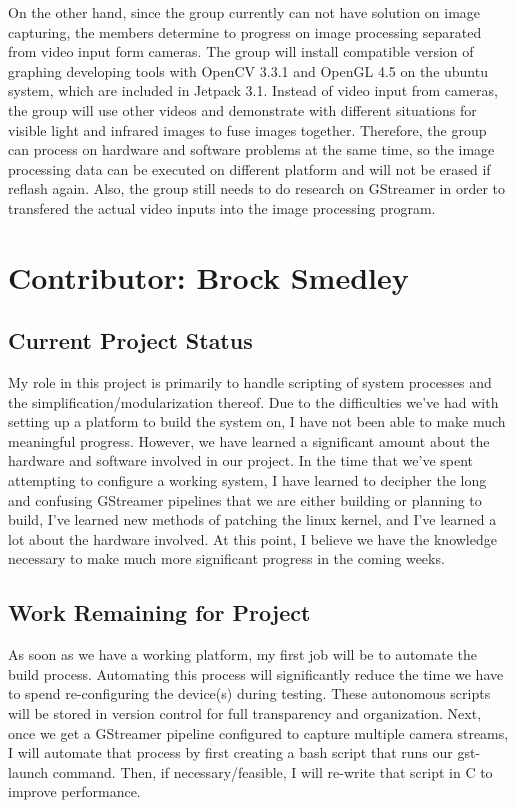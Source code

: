 \documentclass[letterpaper,10pt,serif,draftclsnofoot,onecolumn,compsoc,titlepage]{IEEEtran}
\begin{document}
 On the other hand, since the group currently can not have solution on image capturing, the members 
 determine to progress on image processing separated from video input form cameras. The group will 
 install compatible version of graphing developing tools with OpenCV 3.3.1 and OpenGL 4.5 on the ubuntu 
 system, which are included in Jetpack 3.1. Instead of video input from cameras, the group will use 
 other videos and demonstrate with different situations for visible light and infrared images to fuse 
 images together. Therefore, the group can process on hardware and software problems at the same time, 
 so the image processing data can be executed on different platform and will not be erased if reflash again. 
 Also, the group still needs to do research on GStreamer in order to transfered the actual video inputs 
 into the image processing program.\\


\newpage
\section{Contributor: Brock Smedley}
\subsection{Current Project Status}
My role in this project is primarily to handle scripting of system processes and the simplification/modularization thereof. Due to the difficulties we've had with setting up a platform to build the system on, I have not been able to make much meaningful progress. However, we have learned a significant amount about the hardware and software involved in our project. In the time that we've spent attempting to configure a working system, I have learned to decipher the long and confusing GStreamer pipelines that we are either building or planning to build, I've learned new methods of patching the linux kernel, and I've learned a lot about the hardware involved. At this point, I believe we have the knowledge necessary to make much more significant progress in the coming weeks.

\subsection{Work Remaining for Project}
As soon as we have a working platform, my first job will be to automate the build process. Automating this process will significantly reduce the time we have to spend re-configuring the device(s) during testing. These autonomous scripts will be stored in version control for full transparency and organization. Next, once we get a GStreamer pipeline configured to capture multiple camera streams, I will automate that process by first creating a bash script that runs our gst-launch command. Then, if necessary/feasible, I will re-write that script in C to improve performance.
\end{document}
